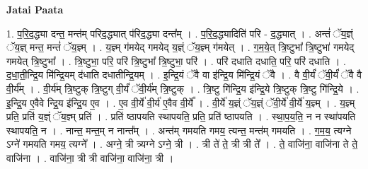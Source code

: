 \documentclass[17pt]{extarticle}
\begin{document}
\textbf{Jatai Paata} \newline

1. प॒रि॒द॒द्ध्या दन्त॒ मन्त॑म् परिद॒द्ध्यात् प॑रिद॒द्ध्या दन्त᳚म् । . प॒रि॒द॒द्ध्यादिति॑ परि - द॒द्ध्यात् । . अन्तं॑ ॅय॒ज्ञ्ं ॅय॒ज्ञ् मन्त॒ मन्तं॑ ॅय॒ज्ञ्म् । . य॒ज्ञ्म् ग॑मयेद् गमयेद् य॒ज्ञ्ं ॅय॒ज्ञ्म् ग॑मयेत् । . ग॒म॒ये॒त् त्रि॒ष्टुभा᳚ त्रि॒ष्टुभा॑ गमयेद् गमयेत् त्रि॒ष्टुभा᳚ । . त्रि॒ष्टुभा॒ परि॒ परि॑ त्रि॒ष्टुभा᳚ त्रि॒ष्टुभा॒ परि॑ । . परि॑ दधाति दधाति॒ परि॒ परि॑ दधाति । . द॒धा॒ती॒न्द्रि॒य मि॑न्द्रि॒यम् द॑धाति दधातीन्द्रि॒यम् । . इ॒न्द्रि॒यं ॅवै वा इ॑न्द्रि॒य मि॑न्द्रि॒यं ॅवै । . वै वी॒र्यं॑ ॅवी॒र्यं॑ ॅवै वै वी॒र्य᳚म् । . वी॒र्य॑म् त्रि॒ष्टुक् त्रि॒ष्टुग् वी॒र्यं॑ ॅवी॒र्य॑म् त्रि॒ष्टुक् । . त्रि॒ष्टु गि॑न्द्रि॒य इ॑न्द्रि॒ये त्रि॒ष्टुक् त्रि॒ष्टु गि॑न्द्रि॒ये । . इ॒न्द्रि॒य ए॒वैवे न्द्रि॒य इ॑न्द्रि॒य ए॒व । . ए॒व वी॒र्ये॑ वी॒र्य॑ ए॒वैव वी॒र्ये᳚ । . वी॒र्ये॑ य॒ज्ञ्ं ॅय॒ज्ञ्ं ॅवी॒र्ये॑ वी॒र्ये॑ य॒ज्ञ्म् । . य॒ज्ञ्म् प्रति॒ प्रति॑ य॒ज्ञ्ं ॅय॒ज्ञ्म् प्रति॑ । . प्रति॑ ष्ठापयति स्थापयति॒ प्रति॒ प्रति॑ ष्ठापयति । . स्था॒प॒य॒ति॒ न न स्था॑पयति स्थापयति॒ न । . नान्त॒ मन्त॒म् न नान्त᳚म् । . अन्त॑म् गमयति गमय॒ त्यन्त॒ मन्त॑म् गमयति । . ग॒म॒य॒ त्यग्ने ऽग्ने॑ गमयति गमय॒ त्यग्ने᳚ । . अग्ने॒ त्री त्र्यग्ने ऽग्ने॒ त्री । . त्री ते॑ ते॒ त्री त्री ते᳚ । . ते॒ वाजि॑ना॒ वाजि॑ना ते ते॒ वाजि॑ना । . वाजि॑ना॒ त्री त्री वाजि॑ना॒ वाजि॑ना॒ त्री । \newline
\end{document}
